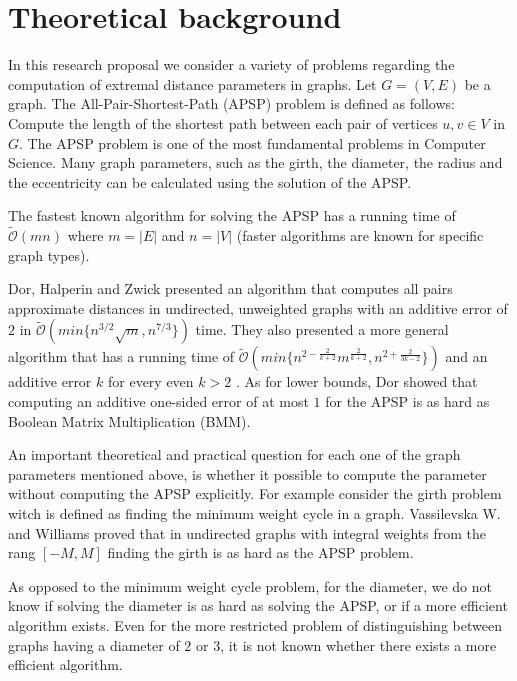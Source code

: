 \section{Theoretical background}
 
In this research proposal we consider a variety of  problems regarding the computation of extremal distance parameters in graphs. Let $G =(V,E)$ be a graph. The All-Pair-Shortest-Path (APSP) problem is defined as follows: Compute the length of the shortest path between each pair of vertices $u,v \in V$ in $G$. The APSP problem is one of the most fundamental problems in Computer Science. Many graph parameters, such as the girth, the diameter, the radius and the eccentricity can be calculated using the solution of the APSP.

The fastest known algorithm for solving the APSP has a running time of  $\mathcal{\tilde{O}}(mn)$ \cite{T99} where $m=|E|$ and $n=|V|$ (faster algorithms are known for specific graph types).

Dor, Halperin and Zwick \cite{DHZ2000} presented an algorithm  that computes all pairs approximate distances in undirected, unweighted graphs with an additive error of $2$ in $\mathcal{\tilde{O}}(min\{n^{3/2}\sqrt{m},n^{7/3}\})$ time. They also presented a more general algorithm that has a running time of $\mathcal{\tilde{O}}(min\{n^{2-\frac{2}{k+2}}m^{\frac{2}{k+2}},n^{2+\frac{2}{3k-2}}\})$ and an additive error $k$  for every even $k>2$ .
As for lower bounds, Dor \etal showed that computing an additive one-sided error of at most $1$ for the APSP is as hard as Boolean Matrix Multiplication (BMM).


An important theoretical and practical question for each one of the graph parameters mentioned above, is whether it possible to compute the parameter without computing the APSP explicitly.
For example consider the girth problem witch is defined as finding the  minimum weight cycle in a graph. Vassilevska W. and Williams \citep{WW10} proved that in undirected graphs with integral weights from the rang $[-M,M]$ finding the girth is as hard as the APSP problem. 


As opposed to the minimum weight cycle problem, for the diameter, we do not know if solving the diameter is as hard as solving the APSP, or if a more efficient algorithm exists. Even for the more restricted problem of distinguishing between graphs having a diameter of $2$ or $3$, it is not known whether there exists a more efficient algorithm. 

